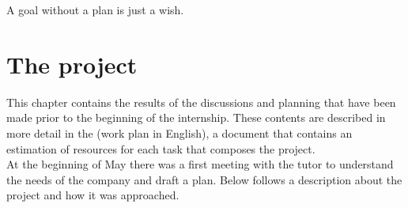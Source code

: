 \begin{savequote}[75mm]
	A goal without a plan is just a wish.
\end{savequote}

\chapter{The project}
\label{chapter_2}

This chapter contains the results of the discussions and planning that have been made prior to the beginning of the internship.
These contents are described in more detail in the  (work plan in English), a document that contains an estimation of resources for each task that composes the project.\\
At the beginning of May there was a first meeting with the tutor to understand the needs of the company and draft a plan.
Below follows a description about the project and how it was approached.

